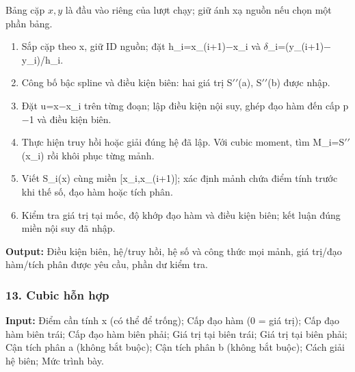 Bảng cặp $x,y$ là đầu vào riêng của lượt chạy; giữ ánh xạ nguồn nếu chọn một phần bảng.

\begin{enumerate}

\item Sắp cặp theo x,\allowbreak{} giữ ID nguồn;\allowbreak{} đặt h\_i=\allowbreak{}x\_(\allowbreak{}i+\allowbreak{}1)\ensuremath{-}x\_i và \ensuremath{\delta}\_i=\allowbreak{}(\allowbreak{}y\_(\allowbreak{}i+\allowbreak{}1)\ensuremath{-}y\_i)/\allowbreak{}h\_i.

\item Công bố bậc spline và điều kiện biên: hai giá trị S\ensuremath{\prime\prime}(\allowbreak{}a),\allowbreak{} S\ensuremath{\prime\prime}(\allowbreak{}b) được nhập.

\item Đặt u=\allowbreak{}x\ensuremath{-}x\_i trên từng đoạn;\allowbreak{} lập điều kiện nội suy,\allowbreak{} ghép đạo hàm đến cấp p\ensuremath{-}1 và điều kiện biên.

\item Thực hiện truy hồi hoặc giải đúng hệ đã lập. Với cubic moment,\allowbreak{} tìm M\_i=\allowbreak{}S\ensuremath{\prime\prime}(\allowbreak{}x\_i) rồi khôi phục từng mảnh.

\item Viết S\_i(\allowbreak{}x) cùng miền [x\_i,\allowbreak{}x\_(\allowbreak{}i+\allowbreak{}1)];\allowbreak{} xác định mảnh chứa điểm tính trước khi thế số,\allowbreak{} đạo hàm hoặc tích phân.

\item Kiểm tra giá trị tại mốc,\allowbreak{} độ khớp đạo hàm và điều kiện biên;\allowbreak{} kết luận đúng miền nội suy đã nhập.

\end{enumerate}

\textbf{Output:} Điều kiện biên,\allowbreak{} hệ/\allowbreak{}truy hồi,\allowbreak{} hệ số và công thức mọi mảnh,\allowbreak{} giá trị/\allowbreak{}đạo hàm/\allowbreak{}tích phân được yêu cầu,\allowbreak{} phần dư kiểm tra.

\examplebreak\subsubsection*{13. Cubic hỗn hợp}

\textbf{Input:} Điểm cần tính x (\allowbreak{}có thể để trống);\allowbreak{} Cấp đạo hàm (\allowbreak{}0 =\allowbreak{} giá trị);\allowbreak{} Cấp đạo hàm biên trái;\allowbreak{} Cấp đạo hàm biên phải;\allowbreak{} Giá trị tại biên trái;\allowbreak{} Giá trị tại biên phải;\allowbreak{} Cận tích phân a (\allowbreak{}không bắt buộc);\allowbreak{} Cận tích phân b (\allowbreak{}không bắt buộc);\allowbreak{} Cách giải hệ biên;\allowbreak{} Mức trình bày.

